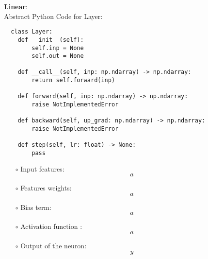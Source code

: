 \documentclass{article}
\newenvironment{cheatformula}[1][כותרת]{
    \begin{minipage}{\linewidth}
    \textbf{#1}: \\
}{
    \end{minipage}\\[0ex]
}
\begin{document}
\begin{cheatformula}[Linear]
Abstract Python Code for Layer:
\begin{lstlisting}
  class Layer:
    def __init__(self):
        self.inp = None
        self.out = None

    def __call__(self, inp: np.ndarray) -> np.ndarray:
        return self.forward(inp)

    def forward(self, inp: np.ndarray) -> np.ndarray:
        raise NotImplementedError

    def backward(self, up_grad: np.ndarray) -> np.ndarray:
        raise NotImplementedError

    def step(self, lr: float) -> None:
        pass
\end{lstlisting}

\begin{itemize}
  \item[$\circ$] Input features:
  \begin{equation}
a  
  \end{equation}

  \item[$\circ$] Features weights:
  \begin{equation}
  a
  \end{equation}

  \item[$\circ$] Bias term:
  \begin{equation}
  a
  \end{equation}

  
  \item[$\circ$] Activation function :
  \begin{equation}
  a
  \end{equation}

  
  \item[$\circ$] Output of the neuron:
  \begin{equation}
  y
  \end{equation}
\end{itemize}
\end{cheatformula}
\end{document}
